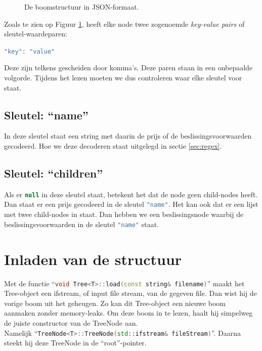 \begin{figure}[ht]
    \centering
    
    \caption{De boomstructuur in JSON-formaat.}
    \label{fig:json_tree}
\end{figure}

Zoals te zien op Figuur \ref{fig:json_tree}, heeft elke node twee zogenoemde \textit{key-value pairs} of sleutel-waardeparen:

\nopagebreak
\lstinline[language=JavaScript]{"key": "value"}
\nopagebreak

Deze zijn telkens gescheiden door komma's. Deze paren staan in een onbepaalde volgorde. Tijdens het lezen moeten we dus controleren waar elke sleutel voor staat.

\newpage

\subsection{Sleutel: ``name''}
In deze sleutel staat een string met daarin de prijs of de beslissingsvoorwaarden gecodeerd. Hoe we deze decoderen staat uitgelegd in sectie \ref{sec:regex}.

\subsection{Sleutel: ``children''}
Als er \lstinline[language=JavaScript]{null} in deze sleutel staat, betekent het dat de node geen child-nodes heeft. Dan staat er een prijs gecodeerd in de sleutel \lstinline[language=JavaScript]{"name"}.
Het kan ook dat er een lijst met twee child-nodes in staat. Dan hebben we een beslissingsnode waarbij de beslissingsvoorwaarden in de sleutel \lstinline[language=JavaScript]{"name"} staat.

\section{Inladen van de structuur}
Met de functie ``\lstinline[language=C++]{void Tree<T>::load(const string& filename)}'' maakt het Tree-object een ifstream, of input file stream, van de gegeven file. Dan wist hij de vorige boom uit het geheugen. Zo kan dit Tree-object een nieuwe boom aanmaken zonder memory-leaks. Om deze boom in te lezen, haalt hij simpelweg de juiste constructor van de TreeNode aan. \\
Namelijk  ``\lstinline[language=C++]{TreeNode<T>::TreeNode(std::ifstream& fileStream)}''. Daarna steekt hij deze TreeNode in de ``root''-pointer.

